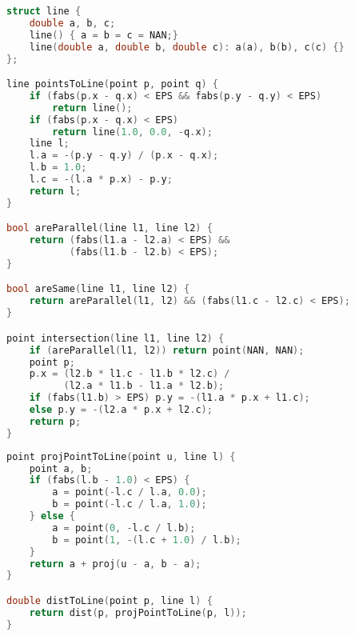 \begin{lstlisting}[language=C++, title=Parte I de II]
struct line {
	double a, b, c;
	line() { a = b = c = NAN;}
	line(double a, double b, double c): a(a), b(b), c(c) {}
};

line pointsToLine(point p, point q) {
	if (fabs(p.x - q.x) < EPS && fabs(p.y - q.y) < EPS)
		return line();
	if (fabs(p.x - q.x) < EPS)
		return line(1.0, 0.0, -q.x);
	line l;
	l.a = -(p.y - q.y) / (p.x - q.x);
	l.b = 1.0;
	l.c = -(l.a * p.x) - p.y;
	return l;
}

bool areParallel(line l1, line l2) {
	return (fabs(l1.a - l2.a) < EPS) && 
	       (fabs(l1.b - l2.b) < EPS);
}

bool areSame(line l1, line l2) {
	return areParallel(l1, l2) && (fabs(l1.c - l2.c) < EPS);
}

point intersection(line l1, line l2) {
	if (areParallel(l1, l2)) return point(NAN, NAN);
	point p;
	p.x = (l2.b * l1.c - l1.b * l2.c) / 
	      (l2.a * l1.b - l1.a * l2.b);
	if (fabs(l1.b) > EPS) p.y = -(l1.a * p.x + l1.c);
	else p.y = -(l2.a * p.x + l2.c);
	return p;
}
\end{lstlisting}

\newpage

\begin{lstlisting}[language=C++, title=Parte II de II]
point projPointToLine(point u, line l) {
	point a, b;
	if (fabs(l.b - 1.0) < EPS) {
		a = point(-l.c / l.a, 0.0);
		b = point(-l.c / l.a, 1.0);
	} else {
		a = point(0, -l.c / l.b);
		b = point(1, -(l.c + 1.0) / l.b);
	}
	return a + proj(u - a, b - a);
}

double distToLine(point p, line l) {
	return dist(p, projPointToLine(p, l));
}
\end{lstlisting}